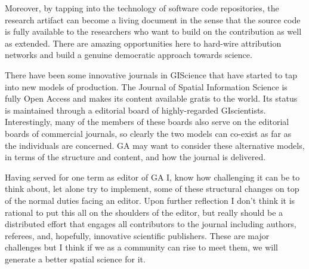 \documentclass[11pt]{article}
\begin{document}
Moreover, by tapping into the technology of software code repositories, the
research artifact can become a living document in the sense that the source
code is fully available to the researchers who want to build on the
contribution as well as extended. There are amazing opportunities here to
hard-wire attribution networks and build a genuine democratic approach towards
science.

There have been some innovative journals in GIScience that have started to tap
into new models of production. The Journal of Spatial Information Science is
fully Open Access and makes its content available gratis to the world. Its
status is maintained through a editorial board of highly-regarded GIscientists.
Interestingly, many of the members of these boards also serve on the editorial
boards of commercial journals, so clearly the two models can co-exist as far as
the individuals are concerned. GA may want to consider these alternative models,
in terms of the structure and content, and how the journal is delivered.

Having served for one term as editor of GA I, know how challenging it can be
to think about, let alone try to implement, some of these structural changes on
top of the normal duties facing an editor. Upon further reflection I don't think
it is rational to put this all on the shoulders of the editor, but really should
be a distributed effort that engages all contributors to the journal including
authors, referees, and, hopefully, innovative scientific publishers. These are
major challenges but I think if we as a community can rise to meet them, we will
generate a better spatial science for it.



\end{document}

